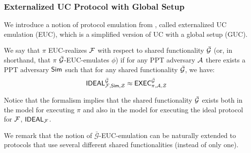 \begin{center}
\end{center}

\subsubsection{Externalized UC Protocol with Global Setup} We introduce a notion of protocol
emulation from \cite{TCC:CDPW07}, called externalized UC emulation (EUC), which is a simplified version of UC with a global setup (GUC).


\begin{definition}
 We say that $\pi$ EUC-realizes $\mathcal{F}$ with respect to shared functionality $\bar{\mathcal{G}}$ (or, in shorthand,
that $\pi$ $\bar{\mathcal{G}}$-EUC-emulates $\phi$) if for any PPT adversary $\mathcal{A}$ there exists a PPT adversary $\mathsf{Sim}$ such that
for any shared functionality $\bar {\mathcal{G}}$, we have:
$$
\mathsf{IDEAL}^{\bar{\mathcal{G}}}_{\mathcal{F},\mathsf{Sim},\mathcal{Z}}
\approx 
\mathsf{EXEC}^{\bar{\mathcal{G}}}_{\pi,\mathcal{A},\mathcal{Z}}
$$
\end{definition}


Notice that the formalism implies that the shared functionality $\bar{\mathcal{G}}$ exists
both in the model for executing $\pi$ and also in the model for executing the ideal protocol for $\mathcal{F}$,
$\mathsf{IDEAL}_{\mathcal{F}}$.

We remark that the notion of $\bar{\mathcal{G}}$-EUC-emulation can be naturally extended to protocols that use
several different shared functionalities (instead of only one).

